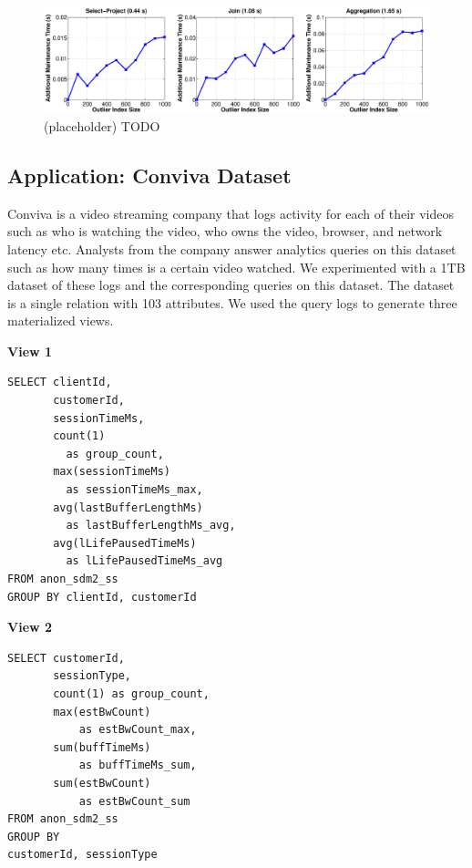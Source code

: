 \begin{figure}[ht!]
\label{exp9outlier}
\centering
\includegraphics[width=\textwidth]{exp/exp9-outlier.eps}
 \caption{(placeholder) TODO}
\end{figure}

\subsection{Application: Conviva Dataset}
Conviva is a video streaming company that logs activity for each of their videos such as who is watching the video, who owns the video, browser, and network latency etc. 
Analysts from the company answer analytics queries on this dataset such as how many times is a certain video watched.
We experimented with a 1TB dataset of these logs and the corresponding queries on this dataset.
The dataset is a single relation with 103 attributes.
We used the query logs to generate three materialized views.
\vspace{1em}

\textbf{View 1}
\begin{lstlisting}
SELECT clientId, 
       customerId, 
       sessionTimeMs, 
       count(1) 
         as group_count, 
       max(sessionTimeMs) 
         as sessionTimeMs_max, 
       avg(lastBufferLengthMs) 
         as lastBufferLengthMs_avg,
       avg(lLifePausedTimeMs) 
         as lLifePausedTimeMs_avg 
FROM anon_sdm2_ss 
GROUP BY clientId, customerId
\end{lstlisting}

\vspace{1em}

\textbf{View 2}
\begin{lstlisting}
SELECT customerId, 
       sessionType, 
       count(1) as group_count, 
       max(estBwCount) 
           as estBwCount_max, 
       sum(buffTimeMs) 
           as buffTimeMs_sum, 
       sum(estBwCount) 
           as estBwCount_sum 
FROM anon_sdm2_ss 
GROUP BY 
customerId, sessionType
\end{lstlisting}

\vspace{1em}


